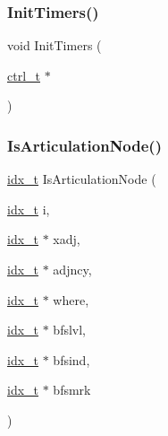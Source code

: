 \subsubsection{\texorpdfstring{Init\+Timers()}{InitTimers()}}
{\footnotesize\ttfamily void Init\+Timers (\begin{DoxyParamCaption}\item[{\hyperlink{a00742}{ctrl\+\_\+t} $\ast$}]{ }\end{DoxyParamCaption})}

\mbox{\label{a00945_af791bf8cc50b3b218224e0560decc422}} 
\subsubsection{\texorpdfstring{Is\+Articulation\+Node()}{IsArticulationNode()}}
{\footnotesize\ttfamily \hyperlink{a00876_aaa5262be3e700770163401acb0150f52}{idx\+\_\+t} Is\+Articulation\+Node (\begin{DoxyParamCaption}\item[{\hyperlink{a00876_aaa5262be3e700770163401acb0150f52}{idx\+\_\+t}}]{i,  }\item[{\hyperlink{a00876_aaa5262be3e700770163401acb0150f52}{idx\+\_\+t} $\ast$}]{xadj,  }\item[{\hyperlink{a00876_aaa5262be3e700770163401acb0150f52}{idx\+\_\+t} $\ast$}]{adjncy,  }\item[{\hyperlink{a00876_aaa5262be3e700770163401acb0150f52}{idx\+\_\+t} $\ast$}]{where,  }\item[{\hyperlink{a00876_aaa5262be3e700770163401acb0150f52}{idx\+\_\+t} $\ast$}]{bfslvl,  }\item[{\hyperlink{a00876_aaa5262be3e700770163401acb0150f52}{idx\+\_\+t} $\ast$}]{bfsind,  }\item[{\hyperlink{a00876_aaa5262be3e700770163401acb0150f52}{idx\+\_\+t} $\ast$}]{bfsmrk }\end{DoxyParamCaption})}

